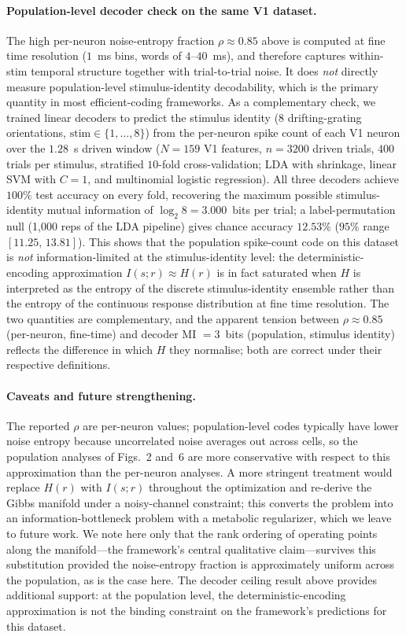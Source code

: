\documentclass[11pt]{article}
\theoremstyle{remark}
\theoremstyle{definition}
\begin{document}
\paragraph{Population-level decoder check on the same V1 dataset.}
The high per-neuron noise-entropy fraction $\rho\approx 0.85$ above is computed at fine time resolution ($1$~ms bins, words of $4$--$40$~ms), and therefore captures within-stim temporal structure together with trial-to-trial noise.  It does \emph{not} directly measure population-level stimulus-identity decodability, which is the primary quantity in most efficient-coding frameworks.  As a complementary check, we trained linear decoders to predict the stimulus identity (8 drifting-grating orientations, $\mathrm{stim}\in\{1,\dots,8\}$) from the per-neuron spike count of each V1 neuron over the $1.28$~s driven window ($N=159$ V1 features, $n=3200$ driven trials, $400$ trials per stimulus, stratified $10$-fold cross-validation; LDA with shrinkage, linear SVM with $C=1$, and multinomial logistic regression).  All three decoders achieve $100\%$ test accuracy on every fold, recovering the maximum possible stimulus-identity mutual information of $\log_2 8 = 3.000$~bits per trial; a label-permutation null (1{,}000 reps of the LDA pipeline) gives chance accuracy $12.53\%$ ($95\%$ range $[11.25,\,13.81]$).  This shows that the population spike-count code on this dataset is \emph{not} information-limited at the stimulus-identity level: the deterministic-encoding approximation $I(s;r)\approx H(r)$ is in fact saturated when $H$ is interpreted as the entropy of the discrete stimulus-identity ensemble rather than the entropy of the continuous response distribution at fine time resolution.  The two quantities are complementary, and the apparent tension between $\rho\approx 0.85$ (per-neuron, fine-time) and decoder MI $=3$~bits (population, stimulus identity) reflects the difference in which $H$ they normalise; both are correct under their respective definitions.

\paragraph{Caveats and future strengthening.}
The reported $\rho$ are per-neuron values; population-level codes typically have lower noise entropy because uncorrelated noise averages out across cells, so the population analyses of Figs.~2 and~6 are more conservative with respect to this approximation than the per-neuron analyses.  A more stringent treatment would replace $H(r)$ with $I(s;r)$ throughout the optimization and re-derive the Gibbs manifold under a noisy-channel constraint; this converts the problem into an information-bottleneck problem with a metabolic regularizer, which we leave to future work.  We note here only that the rank ordering of operating points along the manifold---the framework's central qualitative claim---survives this substitution provided the noise-entropy fraction is approximately uniform across the population, as is the case here.  The decoder ceiling result above provides additional support: at the population level, the deterministic-encoding approximation is not the binding constraint on the framework's predictions for this dataset.
\end{document}
